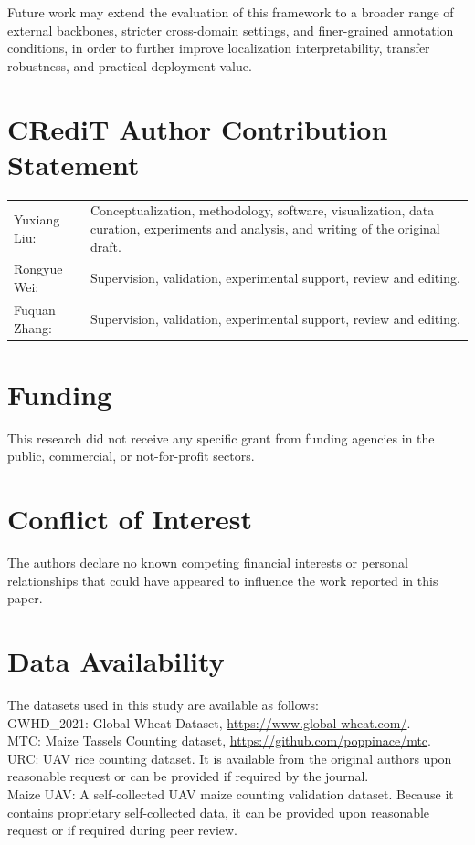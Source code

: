 \documentclass[a4paper,fleqn]{cas-sc}
\begin{document}
	Future work may extend the evaluation of this framework to a broader range of external backbones, stricter cross-domain settings, and finer-grained annotation conditions, in order to further improve localization interpretability, transfer robustness, and practical deployment value.
	
	\section*{CRediT Author Contribution Statement}
	\noindent
	\begin{tabularx}{\linewidth}{@{}p{3cm}X@{}}
		Yuxiang Liu: & Conceptualization, methodology, software, visualization, data curation, experiments and analysis, and writing of the original draft. \\
		Rongyue Wei: & Supervision, validation, experimental support, review and editing. \\
		Fuquan Zhang: & Supervision, validation, experimental support, review and editing. \\
	\end{tabularx}
	
	\section*{Funding}
	\noindent This research did not receive any specific grant from funding agencies in the public, commercial, or not-for-profit sectors.
	
	\section*{Conflict of Interest}
	\noindent The authors declare no known competing financial interests or personal relationships that could have appeared to influence the work reported in this paper.
	
	\section*{Data Availability}
	\noindent The datasets used in this study are available as follows: \\
	GWHD\_2021: Global Wheat Dataset, \url{https://www.global-wheat.com/}. \\
	MTC: Maize Tassels Counting dataset, \url{https://github.com/poppinace/mtc}. \\
	URC: UAV rice counting dataset. It is available from the original authors upon reasonable request or can be provided if required by the journal. \\
	Maize UAV: A self-collected UAV maize counting validation dataset. Because it contains proprietary self-collected data, it can be provided upon reasonable request or if required during peer review. \\
\end{document}
